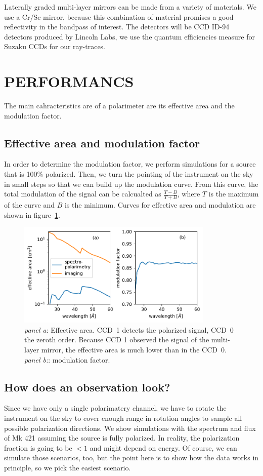 \documentclass[]{spie}  %
\begin{document}
Laterally graded multi-layer mirrors can be made from a variety of materials. We use a Cr/Sc mirror, because this combination of material promises a good reflectivity in the bandpass of interest. The detectors will be CCD ID-94 detectors produced by Lincoln Labs, we use the quantum efficiencies measure for Suzaku CCDs\cite{2007PASJ...59S..23K} for our ray-traces.

\section{PERFORMANCS}
\label{sect:performance}
The main cahracteristics are of a polarimeter are its effective area and the modulation factor.
\subsection{Effective area and modulation factor}
In order to determine the modulation factor, we perform simulations for a source that is 100\% polarized. Then, we turn the pointing of the instrument on the sky in small steps so that we can build up the modulation curve. From this curve, the total modulation of the signal can be calcualted as $\frac{T-B}{T + B}$, where $T$ is the maximum of the curve and $B$ is the minimum. Curves for effective area and modulation are shown in figure~\ref{fig:aeff}.
   \begin{figure} [ht]
   \begin{center}
   \includegraphics[height=5cm]{aeff.pdf}
   \end{center}
   \caption
   { \label{fig:aeff} \emph{panel a}: Effective area. CCD~1 detects the polarized signal, CCD~0 the zeroth order. Because CCD 1 observed the signal of the multi-layer mirror, the effective area is much lower than in the CCD~0. \emph{panel b:}: modulation factor.
}
   \end{figure}

\subsection{How does an observation look?}
Since we have only a single polarimatery channel, we have to rotate the instrument on the sky to cover enough range in rotation angles to sample all possible polarization directions. We show simulations with the spectrum and flux of Mk 421 assuming the source is fully polarized. In reality, the polarization fraction is going to be $<1$ and might depend on energy. Of course, we can simulate those scenarios, too, but the point here is to show how the data works in principle, so we pick the easiest scenario.
\end{document}
